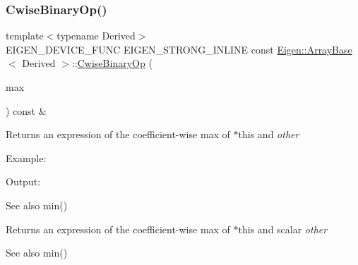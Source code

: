 \subsubsection{\texorpdfstring{CwiseBinaryOp()}{CwiseBinaryOp()}\hspace{0.1cm}{\footnotesize\ttfamily [2/2]}}
{\footnotesize\ttfamily template$<$typename Derived$>$ \\
E\+I\+G\+E\+N\+\_\+\+D\+E\+V\+I\+C\+E\+\_\+\+F\+U\+NC E\+I\+G\+E\+N\+\_\+\+S\+T\+R\+O\+N\+G\+\_\+\+I\+N\+L\+I\+NE const \mbox{\hyperlink{class_eigen_1_1_array_base}{Eigen\+::\+Array\+Base}}$<$ Derived $>$\+::\mbox{\hyperlink{class_eigen_1_1_cwise_binary_op}{Cwise\+Binary\+Op}} (\begin{DoxyParamCaption}\item[{max}]{ }\end{DoxyParamCaption}) const \&\hspace{0.3cm}{\ttfamily [inline]}}

\begin{DoxyReturn}{Returns}
an expression of the coefficient-\/wise max of {\ttfamily $\ast$this} and {\itshape other} 
\end{DoxyReturn}
Example\+: 
\begin{DoxyCodeInclude}{0}
\end{DoxyCodeInclude}
 Output\+: 
\begin{DoxyVerbInclude}
\end{DoxyVerbInclude}


\begin{DoxySeeAlso}{See also}
min()
\end{DoxySeeAlso}
\begin{DoxyReturn}{Returns}
an expression of the coefficient-\/wise max of {\ttfamily $\ast$this} and scalar {\itshape other} 
\end{DoxyReturn}
\begin{DoxySeeAlso}{See also}
min() 
\end{DoxySeeAlso}
\mbox{\label{class_eigen_1_1_array_base_a5bce24aa0762399c48cde7777c21c9e2}} 
